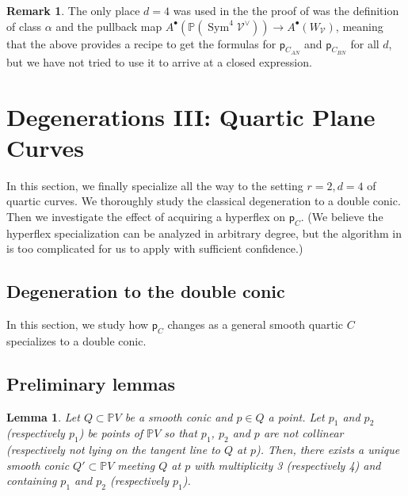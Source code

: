\documentclass[12 pt, reqno]{amsart}
\newtheorem{lem}[thm]{Lemma}
\theoremstyle{definition}
\newtheorem{rmk}[thm]{Remark}
\newcommand{\on}{\operatorname}
\newcommand{\mb}{\mathbb}
\newcommand{\mc}{\mathcal}
\renewcommand{\P}{\mb{P}}
\newcommand{\p}{\mathsf{p}}
\begin{document}
\begin{rmk}
  The only place $d=4$ was used in the the proof of 
  was the definition of class $\alpha$ and the pullback map
  $A^{\bullet}(\mb{P}(\on{Sym}^4\mc{V}^\vee))\to
  A^{\bullet}(W_{\mc{V}})$, meaning that the above provides a recipe
  to get the formulas for $\p_{C_{AN}}$ and $\p_{C_{BN}}$ for all $d$,
  but we have not tried to use it to arrive at a closed expression.
\end{rmk}
  






























\section{Degenerations III: Quartic Plane Curves}
In this section, we finally specialize all the way to the setting
$r=2, d=4$ of quartic curves. We thoroughly study the classical
degeneration to a double conic.  Then we investigate the effect of
acquiring a hyperflex on $\p_{C}$. (We believe the hyperflex
specialization can be analyzed in arbitrary degree, but the algorithm
in \cite{AF00} is too complicated for us to apply with sufficient
confidence.)

\subsection{Degeneration to the double conic}

In this section, we study how $\p_{C}$ changes as a general smooth
quartic $C$ specializes to a double conic.


\subsection{Preliminary lemmas}

\begin{lem}
\label{interpolate}
Let $Q \subset \P V$ be a smooth conic and $p\in Q$ a point. Let $p_1$
and $p_2$ (respectively $p_1$) be points of $\mb{P} V$ so that $p_1$,
$p_2$ and $p$ are not collinear (respectively not lying on the tangent
line to $Q$ at $p$).  Then, there exists a unique smooth conic
$Q' \subset \P V$ meeting $Q$ at $p$ with multiplicity 3 (respectively
4) and containing $p_1$ and $p_2$ (respectively $p_1$).
\end{lem}
\end{document}

